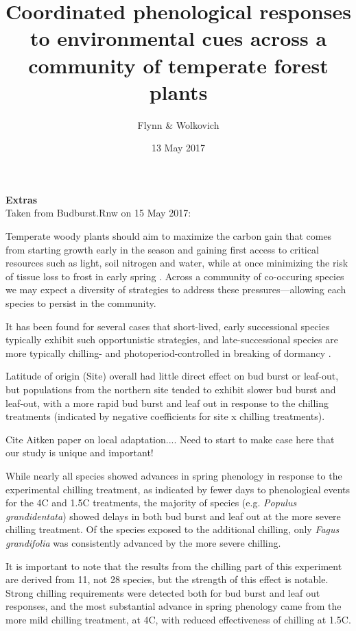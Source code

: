 \documentclass[11pt,a4paper]{article}
\begin{document}

\renewcommand{\refname}{\CHead{}}

\title{Coordinated phenological responses to environmental cues across a community of temperate forest plants}
\date{13 May 2017}
\author{Flynn \& Wolkovich}
\maketitle

{\bf Extras} \\
Taken from Budburst.Rnw on 15 May 2017:

Temperate woody plants should aim to maximize the carbon gain that comes from starting growth early in the season and gaining first access to critical resources such as light, soil nitrogen and water, while at once minimizing the risk of tissue loss to frost in early spring \cite{Korner:2010,Gu:2008aa,Hufkens:2012aa}. Across a community of co-occuring species we may expect a diversity of strategies to address these pressures---allowing each species to persist in the community. 

It has been found for several cases that short-lived, early successional species typically exhibit such opportunistic strategies, and late-successional species are more typically chilling- and photoperiod-controlled in breaking of dormancy \cite{Korner:2010,Caffarra:2011ab,Basler:2012aa}.

 Latitude of origin (Site) overall had little direct effect on bud burst or leaf-out, but populations from the northern site tended to exhibit slower bud burst and leaf-out, with a more rapid bud burst and leaf out in response to the chilling treatments (indicated by negative coefficients for site x chilling treatments).

Cite Aitken paper on local adaptation....
Need to start to make case here that our study is unique and important!

While nearly all species showed advances in spring phenology in response to the experimental chilling treatment, as indicated by fewer days to phenological events for the 4\degree C and 1.5\degree C treatments, the majority of species (e.g. \emph{Populus grandidentata}) showed delays in both bud burst and leaf out at the more severe chilling treatment. Of the species exposed to the additional chilling, only \emph{Fagus grandifolia} was consistently advanced by the more severe chilling.

It is important to note that the results from the chilling part of this experiment are derived from 11, not 28 species, but the strength of this effect is notable. Strong chilling requirements were detected both for bud burst and leaf out responses, and the most substantial advance in spring phenology came from the more mild chilling treatment, at 4\degree C, with reduced effectiveness of chilling at 1.5\degree C. 
\end{document}
